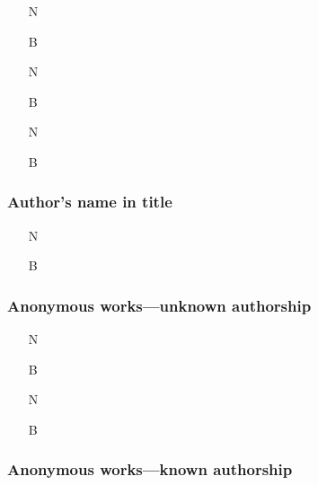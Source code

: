 \documentclass[11pt,letterpaper,oneside]{article}
\begin{document}
\begin{itemize}
\item[N] 

\item[B] 

\item[N] 

\item[B] 

\item[N] 

\item[B] 
\end{itemize}

\setcounter{subsubsection}{77}
\subsubsection{Author's name in title}
\label{14.78}

\begin{itemize}
\item[N] 

\item[B] 


\end{itemize}

\subsubsection{Anonymous works---unknown authorship}

\begin{itemize}
\item[N] 

\item[B] 

\item[N] 

\item[B] 
\end{itemize}

\subsubsection{Anonymous works---known authorship}
\label{14.80}
\end{document}
